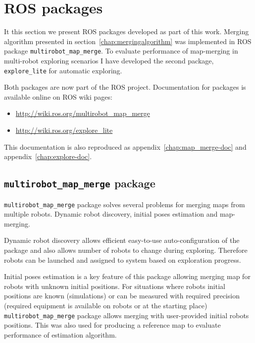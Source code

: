 \chapter{ROS packages}
\label{chap:ros-packages}

It this section we present \gls{ROS} packages developed as part of this work. Merging algorithm presented in section~\ref{chap:mergingalgorithm} was implemented in \gls{ROS} package \texttt{multirobot\_map\_merge}. To evaluate performance of map-merging in multi-robot exploring scenarios I have developed the second package, \texttt{explore\_lite} for automatic exploring.

Both packages are now part of the \gls{ROS} project. Documentation for packages is available online on \gls{ROS} wiki pages:

\begin{itemize}
	\item \url{http://wiki.ros.org/multirobot_map_merge}
	\item \url{http://wiki.ros.org/explore_lite}
\end{itemize}

This documentation is also reproduced as appendix~\ref{chap:map_merge-doc} and appendix~\ref{chap:explore-doc}.

\section{\texttt{multirobot\_map\_merge} package} %
\label{sec:map_merge-package}

\texttt{multirobot\_map\_merge} package solves several problems for merging maps from multiple robots. Dynamic robot discovery, initial poses estimation and map-merging.

Dynamic robot discovery allows efficient easy-to-use auto-configuration of the package and also allows number of robots to change during exploring. Therefore robots can be launched and assigned to system based on exploration progress.

Initial poses estimation is a key feature of this package allowing merging map for robots with unknown initial positions. For situations where robots initial positions are known (simulations) or can be measured with required precision (required equipment is available on robots or at the starting place) \texttt{multirobot\_map\_merge} package allows merging with user-provided initial robots positions. This was also used for producing a reference map to evaluate performance of estimation algorithm.

